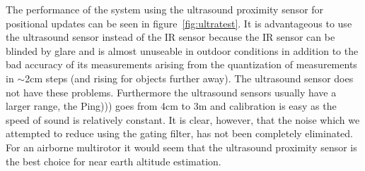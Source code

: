 The performance of the system using the ultrasound proximity sensor for positional updates can be seen in figure~\ref{fig:ultratest}.
It is advantageous to use the ultrasound sensor instead of the IR sensor because the IR sensor can be blinded by glare and is almost
unuseable in outdoor conditions in addition to the bad accuracy of its measurements arising from the quantization of measurements in
\(\sim\)2cm steps (and rising for objects further away). The ultrasound sensor
does not have these problems. Furthermore the ultrasound sensors usually have a
larger range, the Ping))) goes from 4cm to 3m and calibration is easy as the
speed of sound is relatively constant. It is clear, however, that the noise which
we attempted to reduce using the gating filter, has not been completely eliminated. For an airborne multirotor it would seem that the ultrasound proximity sensor is the best choice for near earth altitude estimation.

	
